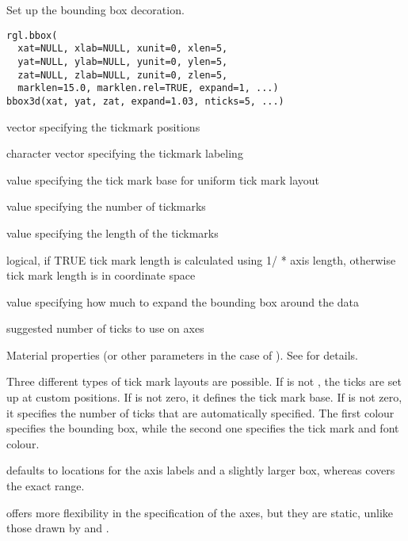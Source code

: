 \documentclass{article}
\begin{document}
\begin{Description}\relax
Set up the bounding box decoration.
\end{Description}
\begin{Usage}
\begin{verbatim}
rgl.bbox( 
  xat=NULL, xlab=NULL, xunit=0, xlen=5, 
  yat=NULL, ylab=NULL, yunit=0, ylen=5,
  zat=NULL, zlab=NULL, zunit=0, zlen=5,
  marklen=15.0, marklen.rel=TRUE, expand=1, ...)
bbox3d(xat, yat, zat, expand=1.03, nticks=5, ...)  
\end{verbatim}
\end{Usage}
\begin{Arguments}
\begin{ldescription}
\item[\code{xat,yat,zat}] vector specifying the tickmark positions
\item[\code{xlab,ylab,zlab}] character vector specifying the tickmark labeling
\item[\code{xunit,yunit,zunit}] value specifying the tick mark base for uniform tick mark layout
\item[\code{xlen,ylen,zlen}] value specifying the number of tickmarks
\item[\code{marklen}] value specifying the length of the tickmarks
\item[\code{marklen.rel}] logical, if TRUE tick mark length is calculated using 1/ * axis length, otherwise tick mark length is  in coordinate space
\item[\code{expand}] value specifying how much to expand the bounding box around the data
\item[\code{nticks}] suggested number of ticks to use on axes
\item[\code{ ... }] Material properties (or other  parameters
in the case of ). See  for details.
\end{ldescription}
\end{Arguments}
\begin{Details}\relax
Three different types of tick mark layouts are possible.
If  is not , the ticks are set up at custom positions.
If  is not zero, it defines the tick mark base.
If  is not zero, it specifies the number of ticks that are automatically specified.
The first colour specifies the bounding box, while the second one specifies the tick mark and font colour.

 defaults to  locations for the axis labels and a slightly larger
box, whereas  covers the exact range.

 offers more flexibility in the specification of the axes, but 
they are static, unlike those drawn by  and .
\end{Details}
\end{document}
